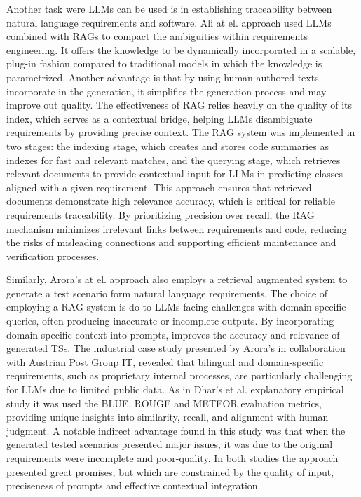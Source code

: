 Another task were LLMs can be used is in establishing traceability between natural language requirements and software. Ali at el. approach \cite{19Ali} used LLMs combined with RAGs to compact the ambiguities within requirements engineering. It offers the knowledge to be dynamically incorporated in  a scalable, plug-in fashion compared to traditional models in which the knowledge is parametrized. Another advantage is that by using human-authored texts incorporate in the generation, it simplifies the generation process and may improve out quality. The effectiveness of RAG relies heavily on the quality of its index, which serves as a contextual bridge, helping LLMs disambiguate requirements by providing precise context.
The RAG system was implemented in two stages: the indexing stage, which creates and stores code summaries as indexes for fast and relevant matches, and the querying stage, which retrieves relevant documents to provide contextual input for LLMs in predicting classes aligned with a given requirement. This approach ensures that retrieved documents demonstrate high relevance accuracy, which is critical for reliable requirements traceability. By prioritizing precision over recall, the RAG mechanism minimizes irrelevant links between requirements and code, reducing the risks of misleading connections and supporting efficient maintenance and verification processes.

Similarly, Arora's at el. approach \cite{20Arora} also employs a retrieval augmented system to generate a test scenario form natural language requirements. The choice of employing a RAG system is do to LLMs facing challenges with domain-specific queries, often producing inaccurate or incomplete outputs. By incorporating domain-specific context into prompts, improves the accuracy and relevance of generated TSs. The industrial case study presented by Arora's \cite{20Arora} in collaboration with Austrian Post Group IT, revealed that bilingual and domain-specific requirements, such as proprietary internal processes, are particularly challenging for LLMs due to limited public data. As in Dhar's et al. explanatory empirical study \cite{17Dhar} it was used the BLUE, ROUGE and METEOR evaluation metrics, providing unique insights into similarity, recall, and alignment with human judgment.
A notable indirect advantage found in this study was that when the generated tested scenarios presented major issues, it was due to the original requirements were incomplete and poor-quality.
In both studies the approach presented great promises, but which are constrained by the quality of input, preciseness of prompts and effective contextual integration.

